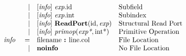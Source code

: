 \documentclass[12pt]{article}
\begin{document}
\[\begin{array}{rrll}
                &\vert &[\text{\em info}]\  \text{\em exp}.\text{id }                                                           &\text{Subfield}\\
                &\vert &[\text{\em info}]\  \text{\em exp}.\text{int}                                                         &\text{Subindex}\\
                &\vert &[\text{\em info}]\  \text{\bf ReadPort}(\text{id}, \text{\em exp})                                         &\text{Structural Read Port}\\
                &\vert &[\text{\em info}]\  \text{\em primop}(\text{\em exp*}, \text{int}\text{*})                                 &\text{Primitive Operation}\\
\text{\em info\ }       &=     &\text{filename } \text{\bf :\ } \text{line} . \text{col}                              &\text{File Location}\\
                &\vert &\text{\bf noinfo\ }                                                                   &\text{No File Location}\\
\end{array}
\]
\end{document}
